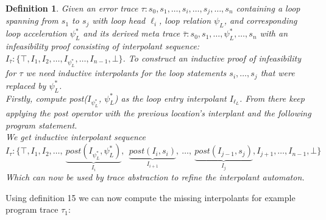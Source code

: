 \documentclass{article}
\newtheorem{mydef}{Definition}
\begin{document}
\begin{mydef}
	Given an error trace $\tau: s_0, s_1, \ldots , s_i, \ldots , s_j, \ldots , s_n$ containing a loop spanning from $s_1$ to $s_j$ with loop head $\ell_i$, loop relation $\psi_L$, and corresponding loop acceleration $\psi^*_{L}$ and its derived meta trace $\bar{\tau}: s_0, s_1, \ldots, \psi^*_{L}, \ldots , s_n$ with an infeasibility proof consisting of interpolant sequence: $I_{\bar{\tau}}: \{\top, I_1, I_2, \ldots , I_{\psi^*_{L}}, \ldots , I_{n-1}, \bot \}$. 
	To construct an inductive proof of infeasibility for $\tau$ we need inductive interpolants for the loop statements $s_i, \ldots , s_j$ that were replaced by $\psi^*_{L}$. \\
	Firstly, compute post($I_{\psi^*_L}$, $\psi^*_L$) as the loop entry interpolant $I_{\ell_L}$. From there keep applying the post operator with the previous location's interplant and the following program statement. \\
	We get inductive interpolant sequence
	\begin{equation*}
		I_\tau: \{\top,I_1,I_2, \ldots ,\ \underbrace{post(I_{\psi^*_L}, \psi^*_L)}_{I_{i}},\ \ \underbrace{post(I_{i}, s_i)}_{I_{i+1}},\ \ldots ,\ \underbrace{post(I_{j-1}, s_j)}_{I_{j}},I_{j+1}, \ldots ,I_{n-1}, \bot \}
	\end{equation*}
	Which can now be used by trace abstraction to refine the interpolant automaton.
\end{mydef}

Using definition 15 we can now compute the missing interpolants for example program trace $\tau_1$:
\end{document}
